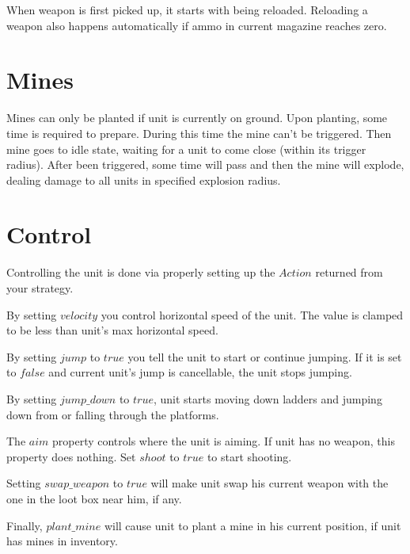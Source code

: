 When weapon is first picked up, it starts with being reloaded.
Reloading a weapon also happens automatically if ammo in current magazine reaches zero.

\section{Mines}

Mines can only be planted if unit is currently on ground.
Upon planting, some time is required to prepare. During this time the mine can't be triggered.
Then mine goes to idle state, waiting for a unit to come close (within its trigger radius).
After been triggered, some time will pass and then the mine will explode, dealing damage to all units in specified explosion radius.

\section{Control}

Controlling the unit is done via properly setting up the $Action$ returned from your strategy.

By setting $velocity$ you control horizontal speed of the unit. The value is clamped to be less than unit's max horizontal speed.

By setting $jump$ to $true$ you tell the unit to start or continue jumping.
If it is set to $false$ and current unit's jump is cancellable, the unit stops jumping.

By setting $jump\_down$ to $true$, unit starts moving down ladders and jumping down from or falling through the platforms.

The $aim$ property controls where the unit is aiming. If unit has no weapon, this property does nothing.
Set $shoot$ to $true$ to start shooting.

Setting $swap\_weapon$ to $true$ will make unit swap his current weapon with the one in the loot box near him, if any.

Finally, $plant\_mine$ will cause unit to plant a mine in his current position, if unit has mines in inventory.